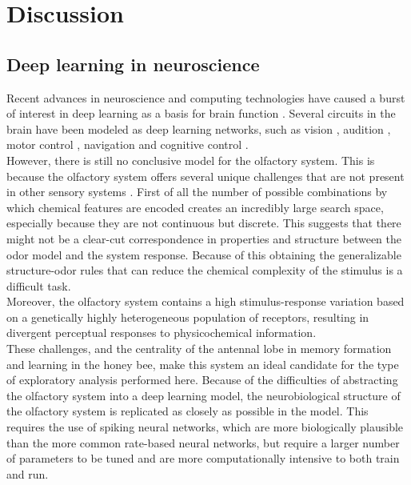 \graphicspath{{chapters/06/images}}
\chapter{Discussion}

\section{Deep learning in neuroscience}
Recent advances in neuroscience and computing technologies have caused a burst of interest in deep learning as a basis for brain function \cite{deep-learning-in-neuroscience}.
Several circuits in the brain have been modeled as deep learning networks, such as vision \cite{deep-learning-vision}, audition \cite{deep-learning-audition}, motor control \cite{deep-learning-motor-control}, navigation \cite{deep-learning-navigation} and cognitive control \cite{deep-learning-cognitive-control}.\\
However, there is still no conclusive model for the olfactory system.
This is because the olfactory system offers several unique challenges that are not present in other sensory systems \cite{deep-learning-olfaction}.
First of all the number of possible combinations by which chemical features are encoded creates an incredibly large search space, especially because they are not continuous but discrete.
This suggests that there might not be a clear-cut correspondence in properties and structure between the odor model and the system response.
Because of this obtaining the generalizable structure-odor rules that can reduce the chemical complexity of the stimulus is a difficult task.\\
Moreover, the olfactory system contains a high stimulus-response variation based on a genetically highly heterogeneous population of receptors, resulting in divergent perceptual responses to physicochemical information.\\
These challenges, and the centrality of the antennal lobe in memory formation and learning in the honey bee, make this system an ideal candidate for the type of exploratory analysis performed here.
Because of the difficulties of abstracting the olfactory system into a deep learning model, the neurobiological structure of the olfactory system is replicated as closely as possible in the model.
This requires the use of spiking neural networks, which are more biologically plausible than the more common rate-based neural networks, but require a larger number of parameters to be tuned and are more computationally intensive to both train and run.

